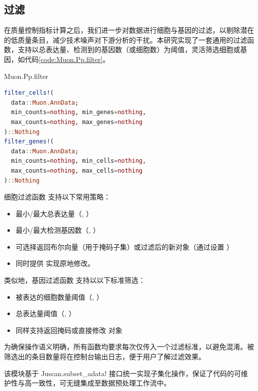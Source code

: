 \subsection{过滤}

在质量控制指标计算之后，我们进一步对数据进行细胞与基因的过滤，以剔除潜在的低质量条目，减少技术噪声对下游分析的干扰。本研究实现了一套通用的过滤函数，支持以总表达量、检测到的基因数（或细胞数）为阈值，灵活筛选细胞或基因，如代码\ref{code:Muon.Pp.filter}。

\begin{fancybox}{Muon.Pp.filter}
\begin{lstlisting}[language=julia]
filter_cells!(
  data::Muon.AnnData;
  min_counts=nothing, min_genes=nothing,
  max_counts=nothing, max_genes=nothing
)::Nothing
filter_genes!(
  data::Muon.AnnData;
  min_counts=nothing, min_cells=nothing,
  max_counts=nothing, max_cells=nothing
)::Nothing
\end{lstlisting}
\end{fancybox}

细胞过滤函数  支持以下常用策略：

  \begin{itemize}
    \item 最小/最大总表达量（, ）
    \item 最小/最大检测基因数（, ）
    \item 可选择返回布尔向量（用于掩码子集）或过滤后的新对象（通过设置 ）
    \item 同时提供  实现原地修改。
  \end{itemize}

类似地，基因过滤函数  支持以以下标准筛选：

  \begin{itemize}
    \item 被表达的细胞数量阈值（, ）
    \item 总表达量阈值（, ）
    \item 同样支持返回掩码或直接修改  对象
  \end{itemize}

为确保操作语义明确，所有函数均要求每次仅传入一个过滤标准，以避免混淆。被筛选出的条目数量将在控制台输出日志，便于用户了解过滤效果。

该模块基于 Juscan.subset\_adata! 接口统一实现子集化操作，保证了代码的可维护性与高一致性，可无缝集成至数据预处理工作流中。

